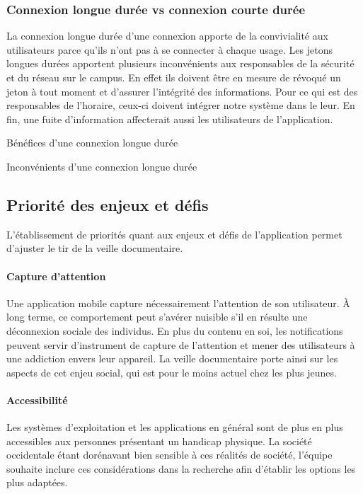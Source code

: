 		\subsubsection{Connexion longue durée vs connexion courte durée}
		La connexion longue durée d’une connexion apporte de la convivialité aux utilisateurs parce qu’ils n’ont pas à se connecter à chaque usage. Les jetons longues durées apportent plusieurs inconvénients aux responsables de la sécurité et du réseau sur le campus. En effet ils doivent être en mesure de révoqué un jeton à tout moment et d’assurer l’intégrité des informations. Pour ce qui est des responsables de l’horaire, ceux-ci doivent intégrer notre système dans le leur. En fin, une fuite d’information affecterait aussi les utilisateurs de l’application. 
	
		\begin{sidewaystable}[p]
			\centering
			\caption{Bénéfices d'une connexion longue durée}
			\label{tab.connexion+}
			
		\bigskip\bigskip
			\centering
			\caption{Inconvénients d'une connexion longue durée}
			
			\label{tab.connexion-}
		\end{sidewaystable}
		
	\subsection{Priorité des enjeux et défis}
	L'établissement de priorités quant aux enjeux et défis de l'application permet d'ajuster le tir de la veille documentaire.
	
	\paragraph{Capture d'attention} Une application mobile capture nécessairement l'attention de son utilisateur. À long terme, ce comportement peut s'avérer nuisible s'il en résulte une déconnexion sociale des individus. En plus du contenu en soi, les notifications peuvent servir d'instrument de capture de l'attention et mener des utilisateurs à une addiction envers leur appareil. La veille documentaire porte ainsi sur les aspects de cet enjeu social, qui est pour le moins actuel chez les plus jeunes.
	
	\paragraph{Accessibilité} Les systèmes d'exploitation et les applications en général sont de plus en plus accessibles aux personnes présentant un handicap physique. La société occidentale étant dorénavant bien sensible à ces réalités de société, l'équipe souhaite inclure ces considérations dans la recherche afin d'établir les options les plus adaptées.
	
